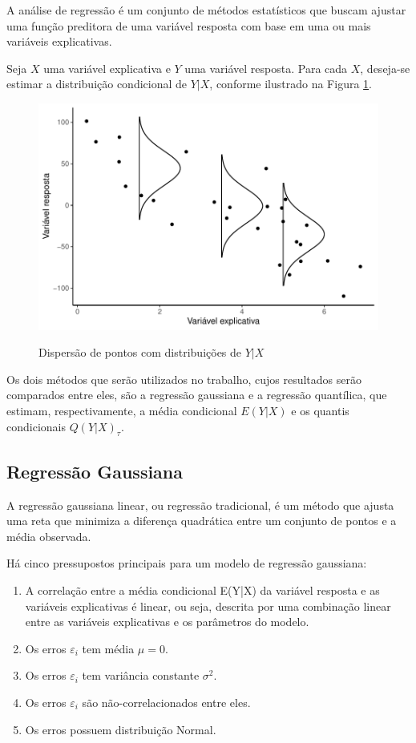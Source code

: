 A análise de regressão é um conjunto de métodos estatísticos que buscam ajustar uma função preditora de uma variável resposta com base em uma ou mais variáveis explicativas.

Seja $X$ uma variável explicativa e $Y$ uma variável resposta. Para cada $X$, deseja-se estimar a distribuição condicional de $Y | X$, conforme ilustrado na Figura \ref{fig:exemplo_regressao}.

\begin{figure}[H]
    \centering
    \caption{Dispersão de pontos com distribuições de $Y | X$}
    \includegraphics[scale=1.05]{imagens/scatter2.pdf}
    \label{fig:exemplo_regressao}
\end{figure}

 Os dois métodos que serão utilizados no trabalho, cujos resultados serão comparados entre eles, são a regressão gaussiana e a regressão quantílica, que estimam, respectivamente, a média condicional $E(Y|X)$ e os quantis condicionais $Q(Y|X)_\tau$.

\subsection{Regressão Gaussiana}
A regressão gaussiana linear, ou regressão tradicional, é um método que ajusta uma reta que minimiza a diferença quadrática entre um conjunto de pontos e a média observada.

Há cinco pressupostos principais para um modelo de regressão gaussiana:

\begin{enumerate}
    \item A correlação entre a média condicional E(Y|X) da variável resposta e as variáveis explicativas é linear, ou seja, descrita por uma combinação linear entre as variáveis explicativas e os parâmetros do modelo.
    \item Os erros $\varepsilon_i$ tem média $\mu = 0$.
    \item Os erros $\varepsilon_i$ tem variância constante $\sigma^2$.
    \item Os erros $\varepsilon_i$ são não-correlacionados entre eles.
    \item Os erros possuem distribuição Normal.
\end{enumerate}

